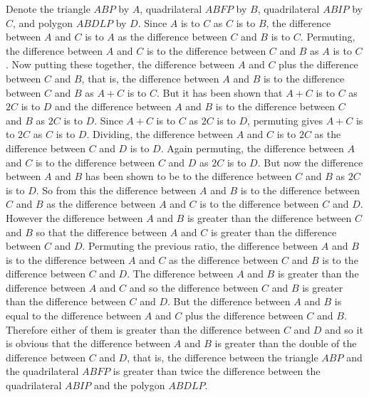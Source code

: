 \documentclass[11pt,letterpaper]{book}
\begin{document}
Denote the triangle $ABP$ by $A$, quadrilateral $ABFP$ by $B$, quadrilateral $ABIP$ by
$C$, and polygon $ABDLP$ by $D$. Since $A$ is to $C$ as $C$ is to $B$, the
difference between $A$ and $C$ is to $A$ as the difference between $C$ and $B$
is to $C$. Permuting, the difference between $A$ and $C$ is to the difference
between $C$ and $B$ as $A$ is to $C$. Now putting these together, the difference
between $A$ and $C$ plus the difference between $C$ and $B$, that is, the
difference between $A$ and $B$ is to the difference between $C$ and $B$ as $A+C$
is to $C$. But it has been shown that $A+C$ is to $C$ as $2C$ is to $D$ and the
difference between $A$ and $B$ is to the difference between $C$ and $B$ as $2C$
is to $D$. Since $A+C$ is to $C$ as $2C$ is to $D$, permuting gives $A+C$ is to
$2C$ as $C$ is to $D$.
Dividing, the difference between $A$ and $C$ is to $2C$ as the difference
between $C$ and $D$ is to $D$. Again permuting, the difference between $A$ and
$C$ is to the difference between $C$ and $D$ as $2C$ is to $D$. But now the
difference between $A$ and $B$ has been shown to be to the difference
between $C$ and $B$ as $2C$ is to $D$. So from this the difference between $A$
and $B$ is to the difference between $C$ and $B$ as the difference between $A$
and $C$ is to the difference between $C$ and $D$. However the difference between
$A$ and $B$ is greater than the difference between $C$ and $B$ so that the
difference between $A$ and $C$ is greater than the difference between $C$ and
$D$. Permuting the previous ratio, the difference between $A$ and $B$ is to the
difference between $A$ and $C$ as the difference between $C$ and $B$ is to the
difference between $C$ and $D$. The difference between $A$ and $B$ is greater
than the difference between $A$ and $C$ and so the difference between $C$ and
$B$ is greater than the difference between $C$ and $D$. But the difference
between $A$ and $B$ is equal to the difference between $A$ and $C$ plus the
difference between $C$ and $B$. Therefore either of them is greater than the
difference between $C$ and $D$ and so it is obvious that the difference between
$A$ and $B$ is greater than the double of the difference between $C$ and $D$,
that is, the difference between the triangle $ABP$ and the quadrilateral $ABFP$
is greater than twice the difference between the quadrilateral $ABIP$ and the
polygon $ABDLP$.
\end{document}

